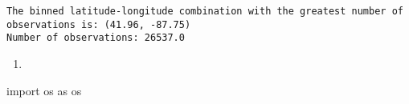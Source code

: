 \documentclass[
  letterpaper,
  DIV=11,
  numbers=noendperiod]{scrartcl}
\newenvironment{Shaded}{\begin{snugshade}}{\end{snugshade}}
\newcommand{\ImportTok}[1]{\textcolor[rgb]{0.00,0.46,0.62}{#1}}
\newcommand{\NormalTok}[1]{\textcolor[rgb]{0.00,0.23,0.31}{#1}}
\providecommand{\tightlist}{%
  \setlength{\itemsep}{0pt}\setlength{\parskip}{0pt}}\usepackage{longtable,booktabs,array}
\begin{document}
\begin{verbatim}
The binned latitude-longitude combination with the greatest number of observations is: (41.96, -87.75)
Number of observations: 26537.0
\end{verbatim}

\begin{enumerate}
\def\labelenumi{\alph{enumi}.}
\setcounter{enumi}{2}
\tightlist
\item
\end{enumerate}

\begin{Shaded}
\begin{Highlighting}[]
\ImportTok{import}\NormalTok{ os }\ImportTok{as}\NormalTok{ os}
\end{Highlighting}
\end{Shaded}
\end{document}
